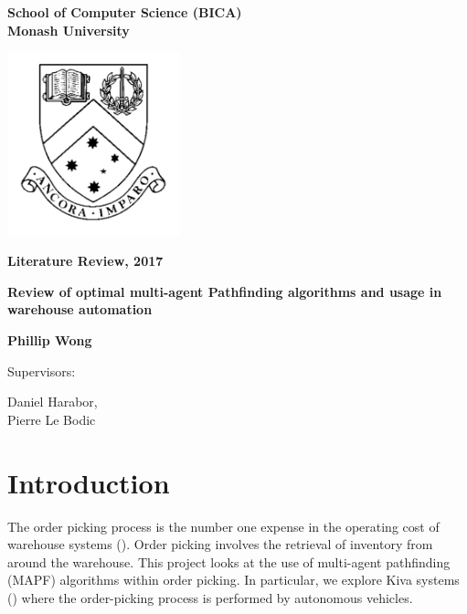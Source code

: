 \documentclass[a4paper,11pt]{article}
\begin{document}
	
\thispagestyle{empty} %
\renewcommand{\thepage}{\roman{page}}

\begin{spacing}{1.5}
	\begin{center}
		{\Large \bfseries
			School of Computer Science (BICA) \\
			Monash University}
		
		
		\vspace*{30mm}
		
		\includegraphics[width=5cm]{graphics/MonashCrest.pdf}
		
		\vspace*{15mm}
		
		{\large \bfseries
			Literature Review, 2017
		}
		
		\vspace*{10mm}
		
		{\LARGE \bfseries
			Review of optimal multi-agent Pathfinding algorithms and usage in warehouse automation
		}
		
		\vspace*{20mm}
		
		{\large \bfseries
			Phillip Wong
			
			\vspace*{20mm}
			
			
			Supervisors: \parbox[t]{50mm}{Daniel Harabor,\\Pierre Le Bodic}
		}
		
	\end{center}
\end{spacing}

\newpage

\tableofcontents

\newpage
\setcounter{page}{1}
\renewcommand{\thepage}{\arabic{page}}

\section{Introduction} \label{sec:introduction}
The order picking process is the number one expense in the operating cost of warehouse systems (\cite{de2007design}). Order picking involves the retrieval of inventory from around the warehouse.
This project looks at the use of multi-agent pathfinding (MAPF) algorithms within order picking. In particular, we explore Kiva systems (\cite{wurman2008coordinating}) where the order-picking process is performed by autonomous vehicles.
\end{document}
